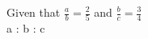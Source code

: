 \documentclass[preview]{standalone}
\begin{document}
\begin{center}
Given that $\frac{a}{b} = \frac{2}{5}$ and $\frac{b}{c} = \frac{3}{4}$\\  a : b : c
\end{center}
\end{document}
